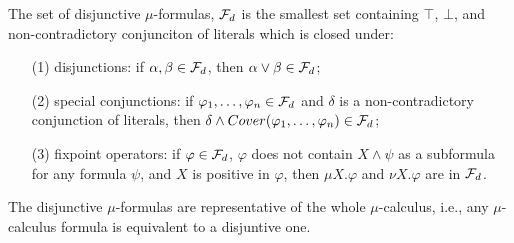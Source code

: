 \documentclass[runningheads]{llncs}
\begin{document}
\begin{definition}
	The set of disjunctive $\mu$-formulas, ${\cal F}_d$ is the smallest set containing $\top$, $\bot$, and non-contradictory conjunciton of literals which is closed under:
	\begin{itemize}
		\item[(1)] disjunctions: if $\alpha, \beta \in {\cal F}_d$, then $\alpha \vee \beta \in {\cal F}_d$;
		\item[(2)] special conjunctions: if $\varphi_1, \dots, \varphi_n\in {\cal F}_d$ and $\delta$ is a non-contradictory
		conjunction of literals, then $\delta \wedge Cover(\varphi_1, \dots, \varphi_n) \in {\cal F}_d$;
		\item[(3)] fixpoint operators: if $\varphi\in  {\cal F}_d$, $\varphi$ does not contain $X \wedge \psi$ as a subformula for
		any formula $\psi$, and $X$ is positive in $\varphi$, then $\mu X. \varphi$ and $\nu X. \varphi$ are in ${\cal F}_d$.
	\end{itemize}
	
\end{definition}

The disjunctive $\mu$-formulas are representative of the whole $\mu$-calculus, i.e., any $\mu$-calculus formula is equivalent to a disjuntive one.
\end{document}
